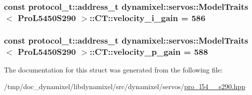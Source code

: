 \subsubsection[{\texorpdfstring{velocity\+\_\+i\+\_\+gain}{velocity_i_gain}}]{\setlength{\rightskip}{0pt plus 5cm}const {\bf protocol\+\_\+t\+::address\+\_\+t} {\bf dynamixel\+::servos\+::\+Model\+Traits}$<$ {\bf Pro\+L5450\+S290} $>$\+::C\+T\+::velocity\+\_\+i\+\_\+gain = 586\hspace{0.3cm}{\ttfamily [static]}}\hypertarget{structdynamixel_1_1servos_1_1_model_traits_3_01_pro_l5450_s290_01_4_1_1_c_t_a25505dd9b6e78c997b33a171b59055e6}{}\label{structdynamixel_1_1servos_1_1_model_traits_3_01_pro_l5450_s290_01_4_1_1_c_t_a25505dd9b6e78c997b33a171b59055e6}
\subsubsection[{\texorpdfstring{velocity\+\_\+p\+\_\+gain}{velocity_p_gain}}]{\setlength{\rightskip}{0pt plus 5cm}const {\bf protocol\+\_\+t\+::address\+\_\+t} {\bf dynamixel\+::servos\+::\+Model\+Traits}$<$ {\bf Pro\+L5450\+S290} $>$\+::C\+T\+::velocity\+\_\+p\+\_\+gain = 588\hspace{0.3cm}{\ttfamily [static]}}\hypertarget{structdynamixel_1_1servos_1_1_model_traits_3_01_pro_l5450_s290_01_4_1_1_c_t_a397e497629a2a76198ea90324d45713f}{}\label{structdynamixel_1_1servos_1_1_model_traits_3_01_pro_l5450_s290_01_4_1_1_c_t_a397e497629a2a76198ea90324d45713f}


The documentation for this struct was generated from the following file\+:\begin{DoxyCompactItemize}
\item 
/tmp/doc\+\_\+dynamixel/libdynamixel/src/dynamixel/servos/\hyperlink{pro__l54__50__s290_8hpp}{pro\+\_\+l54\+\_\+\_\+s290.\+hpp}\end{DoxyCompactItemize}

